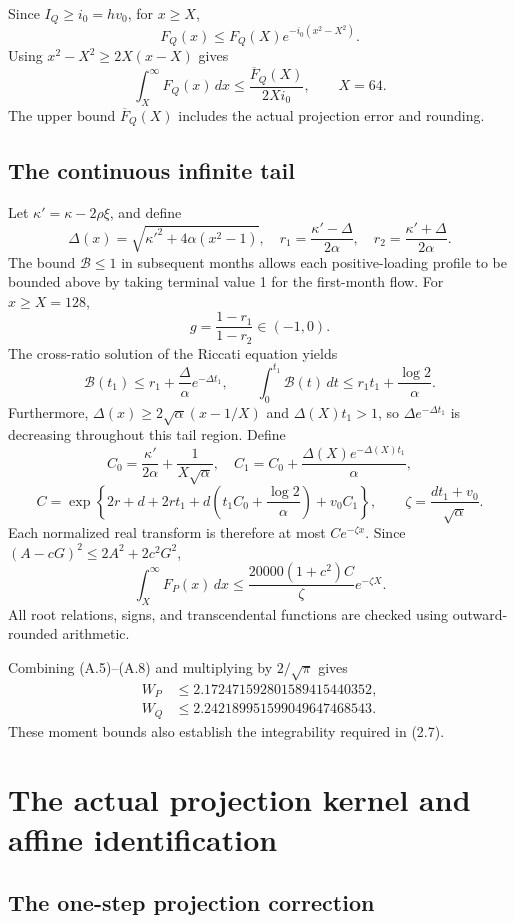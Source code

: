 Since \(I_Q\ge i_0=hv_0\), for \(x\ge X\),
\[
F_Q(x)\le F_Q(X)e^{-i_0(x^2-X^2)}.
\]
Using \(x^2-X^2\ge2X(x-X)\) gives
\[
\int_X^\infty F_Q(x)\,dx\le\frac{\overline F_Q(X)}{2Xi_0},
\qquad X=64.
\tag{A.6}
\]
The upper bound \(\overline F_Q(X)\) includes the actual projection error and rounding.

\subsection{The continuous infinite tail}

Let \(\kappa'=\kappa-2\rho\xi\), and define
\[
\Delta(x)=\sqrt{\kappa'^2+4\alpha(x^2-1)},\quad
r_1=\frac{\kappa'-\Delta}{2\alpha},\quad
r_2=\frac{\kappa'+\Delta}{2\alpha}.
\]
The bound \(\mathcal B\le1\) in subsequent months allows each positive-loading profile to be bounded above by taking terminal value 1 for the first-month flow. For \(x\ge X=128\),
\[
g=\frac{1-r_1}{1-r_2}\in(-1,0).
\]
The cross-ratio solution of the Riccati equation yields
\[
\mathcal B(t_1)\le r_1+\frac{\Delta}{\alpha}e^{-\Delta t_1},
\qquad
\int_0^{t_1}\mathcal B(t)\,dt
\le r_1t_1+\frac{\log2}{\alpha}.
\tag{A.7}
\]
Furthermore, \(\Delta(x)\ge2\sqrt\alpha(x-1/X)\) and \(\Delta(X)t_1>1\), so \(\Delta e^{-\Delta t_1}\) is decreasing throughout this tail region. Define
\[
C_0=\frac{\kappa'}{2\alpha}+\frac1{X\sqrt\alpha},\quad
C_1=C_0+\frac{\Delta(X)e^{-\Delta(X)t_1}}{\alpha},
\]
\[
C=\exp\!\left\{2r+d+2rt_1+
d\left(t_1C_0+\frac{\log2}{\alpha}\right)+v_0C_1\right\},
\qquad \zeta=\frac{dt_1+v_0}{\sqrt\alpha}.
\]
Each normalized real transform is therefore at most \(Ce^{-\zeta x}\). Since \((A-cG)^2\le2A^2+2c^2G^2\),
\[
\int_X^\infty F_P(x)\,dx
\le \frac{20000(1+c^2)C}{\zeta}e^{-\zeta X}.
\tag{A.8}
\]
All root relations, signs, and transcendental functions are checked using outward-rounded arithmetic.

Combining (A.5)--(A.8) and multiplying by \(2/\sqrt\pi\) gives
\[
\begin{aligned}
W_P&\le2.172471592801589415440352,\\
W_Q&\le2.242189951599049647468543.
\end{aligned}
\tag{A.9}
\]
These moment bounds also establish the integrability required in (2.7).

\section{The actual projection kernel and affine identification}

\subsection{The one-step projection correction}

